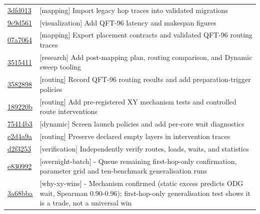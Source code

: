 \begin{longtable}{p{.15\linewidth}p{.77\linewidth}}
\href{https://github.com/sanjeevkrishnaa/Compiler-Driven-ACE/commit/3dfd01314512778b1f67e85775215a45faf6b9c1}{3dfd013} & [mapping] Import legacy hop traces into validated migrations \\
\href{https://github.com/sanjeevkrishnaa/Compiler-Driven-ACE/commit/9c9d561e45bba7286048f76516a1ed0038cea947}{9c9d561} & [visualization] Add QFT-96 latency and makespan figures \\
\href{https://github.com/sanjeevkrishnaa/Compiler-Driven-ACE/commit/07a7064f356cef5037d688f69d8cf8617e0020ef}{07a7064} & [mapping] Export placement contracts and validated QFT-96 routing traces \\
\href{https://github.com/sanjeevkrishnaa/Compiler-Driven-ACE/commit/351541166c28a9be0abc1939bbd0efbf5b229e40}{3515411} & [research] Add post-mapping plan, routing comparison, and Dynamic sweep tooling \\
\href{https://github.com/sanjeevkrishnaa/Compiler-Driven-ACE/commit/3582898432a1310be1ebe8008eb33b5a5e768c01}{3582898} & [routing] Record QFT-96 routing results and add preparation-trigger policies \\
\href{https://github.com/sanjeevkrishnaa/Compiler-Driven-ACE/commit/189220b446fc2b987750ebeb792ff81d6762958b}{189220b} & [routing] Add pre-registered XY mechanism tests and controlled route interventions \\
\href{https://github.com/sanjeevkrishnaa/Compiler-Driven-ACE/commit/75414b396996ed89c5f14b75b12f751107fa6ace}{75414b3} & [dynamic] Screen launch policies and add per-core wait diagnostics \\
\href{https://github.com/sanjeevkrishnaa/Compiler-Driven-ACE/commit/e2d4a9ac58aeefdcbcb9c246b3b6fdfe028520a2}{e2d4a9a} & [routing] Preserve declared empty layers in intervention traces \\
\href{https://github.com/sanjeevkrishnaa/Compiler-Driven-ACE/commit/d2f3253de2531e067924a560e031c5f5758e584b}{d2f3253} & [verification] Independently verify routes, loads, waits, and statistics \\
\href{https://github.com/sanjeevkrishnaa/Compiler-Driven-ACE/commit/e830992ed9cbd286d7e8072bbf5c9adff8e7283a}{e830992} & [overnight-batch] - Queue remaining first-hop-only confirmation, parameter grid and ten-benchmark generalisation runs \\
\href{https://github.com/sanjeevkrishnaa/Compiler-Driven-ACE/commit/3a68bba5cec3fdb8d29d3c00daed96e137613d05}{3a68bba} & [why-xy-wins] - Mechanism confirmed (static excess predicts ODG wait, Spearman 0.90-0.96); first-hop-only generalisation test shows it is a trade, not a universal win \\

\end{longtable}
